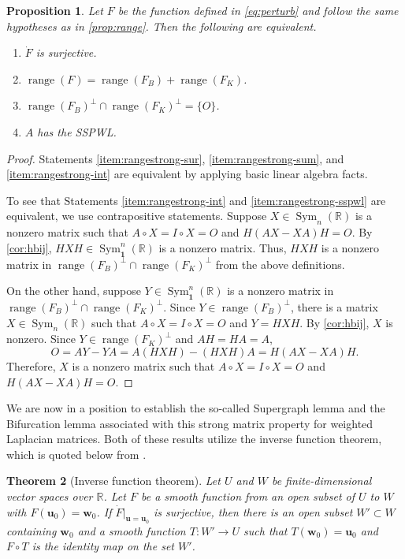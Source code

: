 \documentclass{article}
\newtheorem{theorem}{Theorem}[section]
\newtheorem{proposition}[theorem]{Proposition}
\theoremstyle{definition}
\newcommand{\bone}{\mathbf{1}}
\newcommand{\bu}{\mathbf{u}}
\newcommand{\bw}{\mathbf{w}}
\newcommand{\range}{\operatorname{range}}
\newcommand{\msym}[1][n]{\operatorname{Sym}_{#1}(\mathbb{R})}
\newcommand{\msymz}[1][n]{\operatorname{Sym}_{\bone}^{#1}(\mathbb{R})}
\begin{document}
\begin{proposition}
\label{prop:rangestrong} 
Let $F$ be the function defined in \cref{eq:perturb} and follow the same hypotheses as in \cref{prop:range}.
Then the following are equivalent. 
\begin{enumerate}[label={\rm(\arabic*)}]
\item $\dot{F}$ is surjective. \label{item:rangestrong-sur}
\item $\range(F) = \range(F_B) + \range(F_K)$. \label{item:rangestrong-sum}  
\item $\range(F_B)^{\perp} \cap \range(F_K)^{\perp} = \{O\}$. \label{item:rangestrong-int}
\item $A$ has the SSPWL. \label{item:rangestrong-sspwl}
\end{enumerate}
\end{proposition}
\begin{proof}
Statements \ref{item:rangestrong-sur}, \ref{item:rangestrong-sum}, and \ref{item:rangestrong-int} are equivalent by applying basic linear algebra facts.

To see that Statements \ref{item:rangestrong-int} and \ref{item:rangestrong-sspwl} are equivalent, we use contrapositive statements.  Suppose $X\in\msym$ is a nonzero matrix such that $A\circ X = I\circ X = O$ and $H(AX-XA)H = O$.  By \cref{cor:hbij}, $HXH\in\msymz$ is a nonzero matrix.  Thus, $HXH$ is a nonzero matrix in $\range(F_B)^{\perp} \cap \range(F_K)^{\perp}$ from the above definitions.

On the other hand, suppose $Y\in\msymz$ is a nonzero matrix in $\range(F_B)^{\perp} \cap \range(F_K)^{\perp}$.  
Since $Y\in\range(F_B)^{\perp}$, there is a matrix $X\in\msym$ such that $A\circ X = I\circ X = O$ and $Y = HXH$.  By \cref{cor:hbij}, $X$ is nonzero.  Since $Y\in\range(F_K)^{\perp}$ and $AH = HA = A$, 
\[
    O = AY - YA = A(HXH) - (HXH)A = H(AX - XA)H.
\]
Therefore, $X$ is a nonzero matrix such that $A\circ X = I\circ X = O$ and $H(AX - XA)H = O$.
\end{proof}

We are now in a position to establish the so-called Supergraph lemma and the Bifurcation lemma associated with this strong matrix property for weighted Laplacian matrices.  Both of these results utilize the inverse function theorem, which is quoted below from \cite[Theorem~2.4]{bifur}.

\begin{theorem}[Inverse function theorem]
\label{thm:inv}
Let $U$ and $W$ be finite-dimensional vector spaces over $\mathbb{R}$.  Let $F$ be a smooth function from an open subset of $U$ to $W$ with $F(\bu_0) = \bw_0$.  If $\dot{F}\Big|_{\bu = \bu_0}$ is surjective, then there is an open subset $W' \subset W$ containing $\bw_0$ and a smooth function $T: W' \rightarrow U$ such that $T(\bw_0) = \bu_0$ and $F\circ T$ is the identity map on the set $W'$.
\end{theorem}
\end{document}
